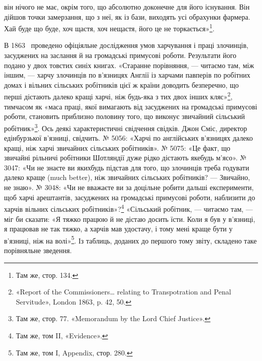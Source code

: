 \parcont{}  %
він нічого не має, окрім того, що абсолютно доконечне для його
існування. Він дійшов точки замерзання, що з неї, як із бази,
виходять усі обрахунки фармера. Хай буде що буде, хоч щастя,
хоч нещастя, його це не торкається»\footnote{
Там же, стор. 134.
}.

В 1863~ проведено офіціяльне дослідження умов харчування
і праці злочинців, засуджених на заслання й на громадські примусові
роботи. Результати його подано у двох товстих синіх
книгах. «Старанне порівняння, — читаємо там, між іншим, —
харчу злочинців по в’язницях Англії із харчами павперів по
робітних домах і вільних сільських робітників цієї ж країни
доводить безперечно, що перші дістають далеко кращі харчі,
ніж будь-яка з тих двох інших кляс»\footnote{
«Report of the Commissioners\dots{} relating to Transpotration and
Penal Servitude», London 1863, p. 42, 50.
}, тимчасом як «маса
праці, якої вимагають від засуджених на громадські примусові
роботи, становить приблизно половину того, що виконує звичайний
сільський робітник»\footnote{
Там же, стор. 77. «Memorandum by the Lord Chief Justice».
}. Ось деякі характеристичні свідчення
свідків. Джон Сміс, директор едінбурзької в’язниці, свідчить.
№ 5056: «Харчі по англійських в’язницях далеко кращі, ніж
харчі звичайних сільських робітників». № 5075: «Це факт, що
звичайні рільничі робітники Шотляндії дуже рідко дістають якебудь
м’ясо». № 3047: «Чи не знаєте ви якихбудь підстав для
того, що злочинців треба годувати далеко краще (much better),
ніж звичайних сільських робітників? — Звичайно, не знаю».
№ 3048: «Чи не вважаєте ви за доцільне робити дальші експерименти,
щоб харчі арештантів, засуджених на громадські примусові
роботи, наблизити до харчів вільних сільських робітників»?\footnote{
Там же, том II, «Evidence».
} «Сільський робітник, — читаємо там, — міг би сказати:
«Я тяжко працюю й не дістаю досить їсти. Коли я був у
в’язниці, я працював не так тяжко, а харчів мав удостачу, і тому
мені краще бути у в’язниці, ніж на волі»\footnote{
Там же, том I, Appendix, стор. 280.
}. Із таблиць, доданих
до першого тому звіту, складено таке порівняльне зведення.

